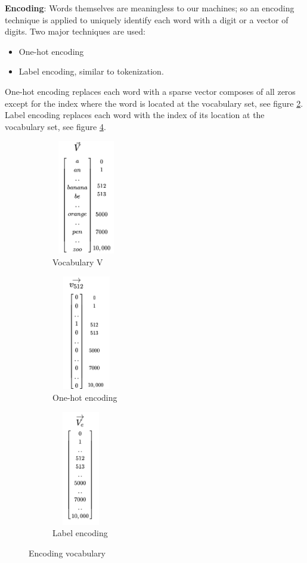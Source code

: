 \textbf{Encoding}: Words themselves are meaningless to our machines; so an encoding technique is applied to uniquely identify each word with a digit or a vector of digits. Two major techniques are used:
\begin{itemize}
    \item One-hot encoding
    \item Label encoding, similar to tokenization.
\end{itemize}
One-hot encoding replaces each word with a sparse vector composes of all zeros except for the index where the word is located at the vocabulary set, see figure \ref{fig:one-hot encoding}.
Label encoding replaces each word with the index of its location at the vocabulary set, see figure \ref{fig:label encoding}.

\begin{figure}[h!]
    \begin{subfigure}[b]{0.3\textwidth}
    \includegraphics[width=3cm,height=5cm]{images/v.png}
    \caption{Vocabulary V}
    \label{fig:vocabulary}
    \end{subfigure}
    \hfill
    \begin{subfigure}[b]{0.3\textwidth}
        \includegraphics[width=3cm,height=5cm]{images/v_2.png}
        \caption{One-hot encoding}
        \label{fig:one-hot encoding}
    \end{subfigure}
    \hfill
    \begin{subfigure}[b]{0.3\textwidth}
        \includegraphics[width=2.5cm,height=5cm]{images/v_3.png}
        \caption{Label encoding}
        \label{fig:label encoding}
    \end{subfigure}
    \caption{Encoding vocabulary}
\end{figure}

